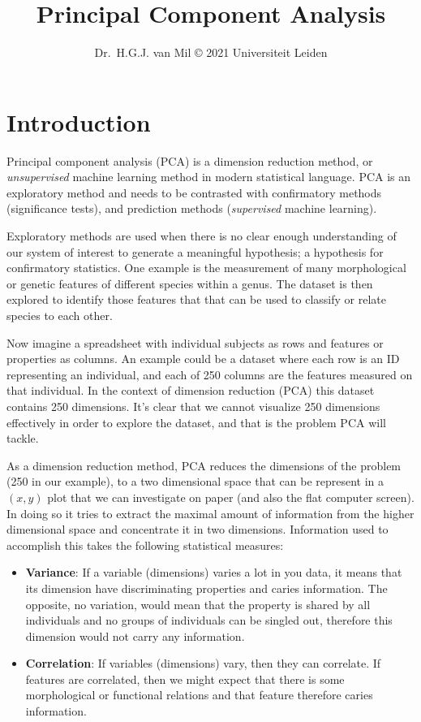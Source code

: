 \documentclass[
]{book}
\title{Principal Component Analysis}
\author{Dr.~H.G.J. van Mil © 2021 Universiteit Leiden}
\date{}
\providecommand{\tightlist}{%
  \setlength{\itemsep}{0pt}\setlength{\parskip}{0pt}}
\begin{document}
\maketitle

{
\setcounter{tocdepth}{1}
\tableofcontents
}
\hypertarget{introduction}{%
\chapter*{Introduction}\label{introduction}}

Principal component analysis (PCA) is a dimension reduction method, or \emph{unsupervised} machine learning method in modern statistical language. PCA is an exploratory method and needs to be contrasted with confirmatory methods (significance tests), and prediction methods (\emph{supervised} machine learning).

Exploratory methods are used when there is no clear enough understanding of our system of interest to generate a meaningful hypothesis; a hypothesis for confirmatory statistics. One example is the measurement of many morphological or genetic features of different species within a genus. The dataset is then explored to identify those features that that can be used to classify or relate species to each other.

Now imagine a spreadsheet with individual subjects as rows and features or properties as columns. An example could be a dataset where each row is an ID representing an individual, and each of 250 columns are the features measured on that individual. In the context of dimension reduction (PCA) this dataset contains 250 dimensions. It's clear that we cannot visualize 250 dimensions effectively in order to explore the dataset, and that is the problem PCA will tackle.

As a dimension reduction method, PCA reduces the dimensions of the problem (250 in our example), to a two dimensional space that can be represent in a \((x, y)\) plot that we can investigate on paper (and also the flat computer screen). In doing so it tries to extract the maximal amount of information from the higher dimensional space and concentrate it in two dimensions. Information used to accomplish this takes the following statistical measures:

\begin{itemize}
\tightlist
\item
  \textbf{Variance}: If a variable (dimensions) varies a lot in you data, it means that its dimension have discriminating properties and caries information. The opposite, no variation, would mean that the property is shared by all individuals and no groups of individuals can be singled out, therefore this dimension would not carry any information.\\
\item
  \textbf{Correlation}: If variables (dimensions) vary, then they can correlate. If features are correlated, then we might expect that there is some morphological or functional relations and that feature therefore caries information.
\end{itemize}
\end{document}

